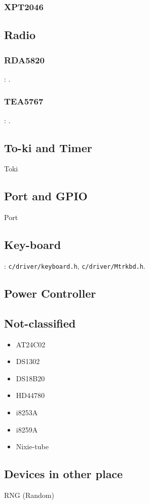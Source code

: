 \subsubsection{XPT2046}

\subsection{Radio}

\subsubsection{RDA5820}

: .

\subsubsection{TEA5767}

: .

\subsection{To-ki and Timer}
{Toki}

\subsection{Port and GPIO}
{Port}

\subsection{Key-board}
: \verb`c/driver/keyboard.h`, \verb`c/driver/Mtrkbd.h`.

\subsection{Power Controller}

\subsection{Not-classified}
\begin{itemize}
	\item AT24C02
	\item DS1302
	\item DS18B20
	\item HD44780
	\item i8253A
	\item i8259A
	\item Nixie-tube
\end{itemize}

\subsection{Devices in other place}

RNG (Random)

